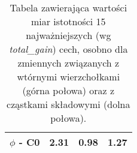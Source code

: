 \begin{table}[ht]
\begin{tabular}{lrrr}
$\phi$ - C0   &         2.31 &             0.98 &              1.27 \\
\bottomrule
\end{tabular}
\caption{Tabela zawierająca wartości miar istotności 15 najważniejszych (wg \textit{total\_gain}) cech, osobno dla zmiennych związanych z wtórnymi wierzchołkami (górna połowa) oraz z cząstkami składowymi (dolna połowa).}
\label{tab:feat_imp_most_sv_constit}
\end{table}



